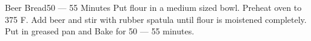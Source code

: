 \documentclass[../main.tex]{subfiles}
\begin{document}
\begin{recipe}{Beer Bread}{}{50 --- 55 Minutes}
    Put flour in a medium sized bowl.
    Preheat oven to 375\degrees{} F. Add beer and stir
    with rubber spatula until flour is moistened
    completely. Put in greased pan and Bake for 50 --- 55
    minutes.
\end{recipe}
\end{document}
